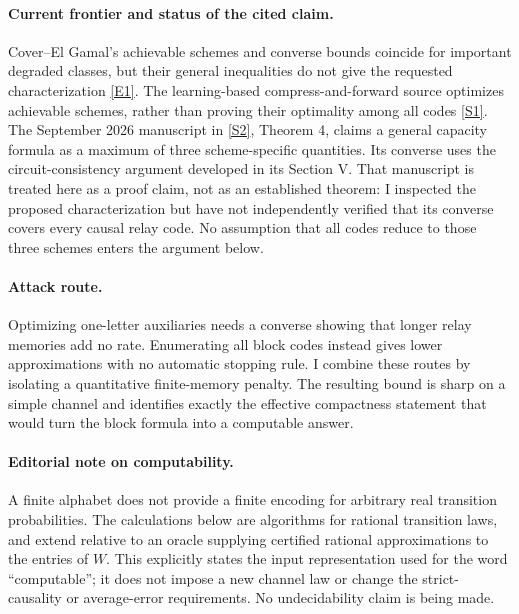 \documentclass[11pt,a4paper]{article}
\newcommand{\sref}[2]{\hyperlink{source:#1:#2}{[S#2]}}
\newcommand{\eref}[2]{\hyperlink{extra:#1:#2}{[E#2]}}
\numberwithin{equation}{section}
\begin{document}
\paragraph{Current frontier and status of the cited claim.}
Cover--El Gamal's achievable schemes and converse bounds coincide for
important degraded classes, but their general inequalities do not give
the requested characterization \eref{statement}{1}. The learning-based
compress-and-forward source optimizes achievable schemes, rather than
proving their optimality among all codes \sref{statement}{1}. The September
2026 manuscript in \sref{statement}{2}, Theorem 4, claims a general capacity
formula as a maximum of three scheme-specific quantities. Its converse
uses the circuit-consistency argument developed in its Section V.
That manuscript is treated here as a proof claim, not as an established
theorem: I inspected the proposed characterization but have not
independently verified that its converse covers every causal relay code.
No assumption that all codes reduce to those three schemes enters the
argument below.

\paragraph{Attack route.}
Optimizing one-letter auxiliaries needs a converse showing that longer
relay memories add no rate. Enumerating all block codes instead gives
lower approximations with no automatic stopping rule. I combine these
routes by isolating a quantitative finite-memory penalty. The resulting
bound is sharp on a simple channel and identifies exactly the effective
compactness statement that would turn the block formula into a
computable answer.

\paragraph{Editorial note on computability.}
A finite alphabet does not provide a finite encoding for arbitrary real
transition probabilities. The calculations below are algorithms for
rational transition laws, and extend relative to an oracle supplying
certified rational approximations to the entries of $W$. This explicitly
states the input representation used for the word ``computable''; it
does not impose a new channel law or change the strict-causality or
average-error requirements. No undecidability claim is being made.
\end{document}
